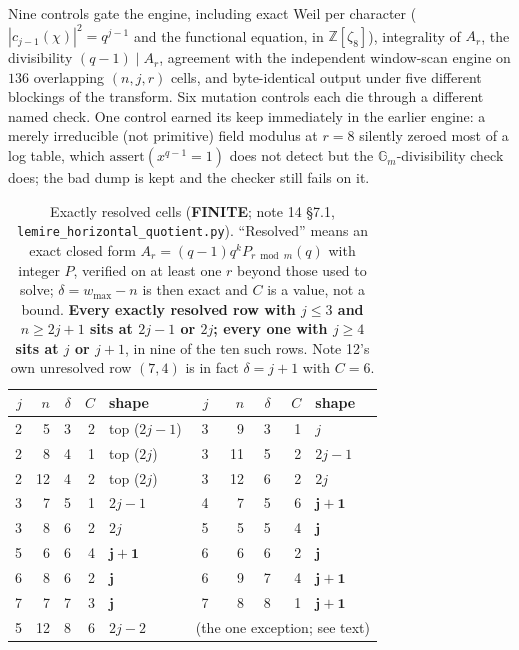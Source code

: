 \documentclass[10pt]{article}
\theoremstyle{plain}
\theoremstyle{definition}
\newcommand{\Z}{\mathbb Z}
\newcommand{\finite}{\textcolor{finite}{\textsf{\textbf{\footnotesize FINITE}}}}
\begin{document}
Nine controls gate the engine, including exact Weil per character
($|c_{j-1}(\chi)|^2=q^{j-1}$ and the functional equation, in $\Z[\zeta_8]$),
integrality of $A_r$, the divisibility $(q-1)\mid A_r$, agreement with the
independent window-scan engine on $136$ overlapping $(n,j,r)$ cells, and
byte-identical output under five different blockings of the transform. Six
mutation controls each die through a different named check. One control earned
its keep immediately in the earlier engine: a merely irreducible (not
primitive) field modulus at $r=8$ silently zeroed most of a log table, which
$\mathrm{assert}(x^{q-1}=1)$ does not detect but the $\mathbb G_m$-divisibility
check does; the bad dump is kept and the checker still fails on it.

\begin{table}[t]
\centering\small
\begin{tabular}{rrrrl@{\qquad}rrrrl}
\hline
$j$ & $n$ & $\delta$ & $C$ & shape & $j$ & $n$ & $\delta$ & $C$ & shape\\
\hline
2 & 5 & 3 & 2 & top ($2j{-}1$) & 3 & 9 & 3 & 1 & $j$\\
2 & 8 & 4 & 1 & top ($2j$) & 3 & 11 & 5 & 2 & $2j{-}1$\\
2 & 12 & 4 & 2 & top ($2j$) & 3 & 12 & 6 & 2 & $2j$\\
3 & 7 & 5 & 1 & $2j{-}1$ & 4 & 7 & 5 & 6 & $\mathbf{j+1}$\\
3 & 8 & 6 & 2 & $2j$ & 5 & 5 & 5 & 4 & $\mathbf{j}$\\
5 & 6 & 6 & 4 & $\mathbf{j+1}$ & 6 & 6 & 6 & 2 & $\mathbf{j}$\\
6 & 8 & 6 & 2 & $\mathbf{j}$ & 6 & 9 & 7 & 4 & $\mathbf{j+1}$\\
7 & 7 & 7 & 3 & $\mathbf{j}$ & 7 & 8 & 8 & 1 & $\mathbf{j+1}$\\
5 & 12 & 8 & 6 & $2j{-}2$ & \multicolumn{5}{l}{(the one exception; see text)}\\
\hline
\end{tabular}
\caption{Exactly resolved cells (\finite; note 14 \S7.1,
\texttt{lemire\_horizontal\_quotient.py}). ``Resolved'' means an exact closed
form $A_r=(q-1)q^kP_{r\bmod m}(q)$ with integer $P$, verified on at least one
$r$ beyond those used to solve; $\delta=w_{\max}-n$ is then exact and $C$ is a
value, not a bound. \textbf{Every exactly resolved row with $j\le3$ and
$n\ge2j+1$ sits at $2j-1$ or $2j$; every one with $j\ge4$ sits at $j$ or
$j+1$}, in nine of the ten such rows. Note 12's own unresolved row $(7,4)$ is
in fact $\delta=j+1$ with $C=6$.}
\label{tab:cells}
\end{table}
\end{document}
